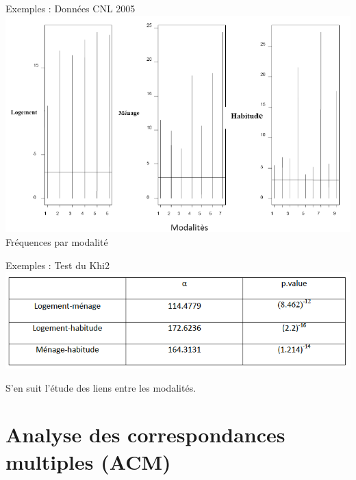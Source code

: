 \documentclass[10pt]{beamer}
\begin{document}
\begin{frame}{Exemples : Données CNL 2005}
\includegraphics[scale=.5]{CNL8} 
Fréquences par modalité 
\end{frame}



\begin{frame}{Exemples : Test du Khi2}
\includegraphics[scale=.45]{CNL9} 



S'en suit l'étude des liens entre les modalités.
\end{frame}

\section{Analyse des correspondances multiples (ACM)}
\end{document}
